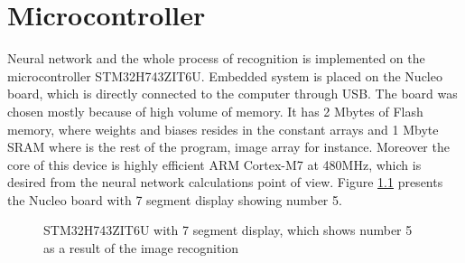 \chapter{Microcontroller}
\endgroup
Neural network and the whole process of recognition is implemented on the microcontroller STM32H743ZIT6U. Embedded system is placed on the Nucleo board, which is directly connected to the computer through USB. The board was chosen mostly because of high volume of memory. It has 2 Mbytes of Flash memory, where weights and biases resides in the constant arrays and 1 Mbyte SRAM where is the rest of the program, image array for instance. Moreover the core of this device is highly efficient ARM Cortex-M7 at 480MHz, which is desired from the neural network calculations point of view. Figure \ref{fig:STM32H743ZIT6U} presents the Nucleo board with 7 segment display showing number 5.
\begin{figure}[H]
	\begin{center}
	\end{center}
	\caption{STM32H743ZIT6U with 7 segment display, which shows number 5 as a result of the image recognition}
	\label{fig:STM32H743ZIT6U}
\end{figure}

